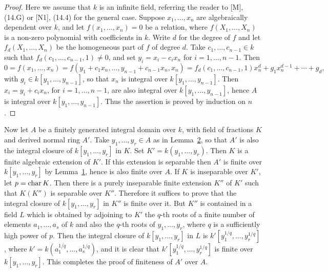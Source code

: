 \begin{proof}
Here we assume that $k$ is an infinite field, referring the reader to [M], (14.G)
or [N1], (14.4) for the general case. Suppose $x_1, \ldots, x_n$ are algebraically
dependent over $k$, and let $f(x_1, \ldots, x_n) = 0$ be a relation, where
$f(X_1, \ldots, X_n)$ is a non-zero polynomial with coefficients in $k$. Write $d$ for
the degree of $f$ and let $f_d(X_1, \ldots, X_n)$ be the homogeneous part of $f$ of
degree $d$. Take $c_1, \ldots, c_{n-1} \in k$ such that
$f_d(c_1, \ldots, c_{n-1}, 1) \ne 0$, and set $y_i = x_i - c_ix_n$ for $i = 1, \ldots, n - 1$. Then
\[
  0 = f(x_1, \ldots, x_n) = f(y_1 + c_1x_n, \ldots, y_{n-1} + c_{n-1}x_n, x_n)
      = f_d(c_1, \ldots, c_{n-1}, 1)x_n^d + g_1x_n^{d-1} + \cdots + g_d,
\]
with $g_i \in k[y_1, \ldots, y_{n-1}]$, so that $x_n$ is integral over
$k[y_1, \ldots, y_{n-1}]$. Then $x_i = y_i + c_ix_n$, for $i = 1, \ldots, n - 1$, are also
integral over $k[y_1, \ldots, y_{n-1}]$, hence $A$ is integral over
$k[y_1, \ldots, y_{n-1}]$. Thus the assertion is proved by induction on $n$.
\end{proof}

Now let $A$ be a finitely generated integral domain over $k$, with field of
fractions $K$ and derived normal ring $A'$. Take $y_1, \ldots, y_r \in A$ as in
Lemma~\hyperref[lem:33.2]{2}, so that $A'$ is also the integral closure of $k[y_1, \ldots, y_r]$ in $K$.
Set $K' = k(y_1, \ldots, y_r)$. Then $K$ is a finite algebraic extension of $K'$. If this
extension is separable then $A'$ is finite over $k[y_1, \ldots, y_r]$ by
Lemma~\hyperref[lem:33.1]{1}, hence is also finite over $A$. If $K$ is inseparable over $K'$, let
$p = \operatorname{char} K$. Then there is a purely inseparable finite extension $K''$ of $K'$ such
that $K(K'')$ is separable over $K''$. Therefore it suffices to prove that the
integral closure of $k[y_1, \ldots, y_r]$ in $K''$ is finite over it. But $K''$ is
contained in a field $L$ which is obtained by adjoining to $K'$ the $q$-th roots of
a finite number of elements $a_1, \ldots, a_s$ of $k$ and also the $q$-th roots of
$y_1, \ldots, y_r$, where $q$ is a sufficiently high power of $p$. Then the integral
closure of $k[y_1, \ldots, y_r]$ in $L$ is $k'[y_1^{1/q}, \ldots, y_r^{1/q}]$, where
$k' = k(a_1^{1/q}, \ldots, a_s^{1/q})$, and it is clear that $k'[y_1^{1/q}, \ldots, y_r^{1/q}]$ is
finite over $k[y_1, \ldots, y_r]$. This completes the proof of finiteness of $A'$ over
$A$.

